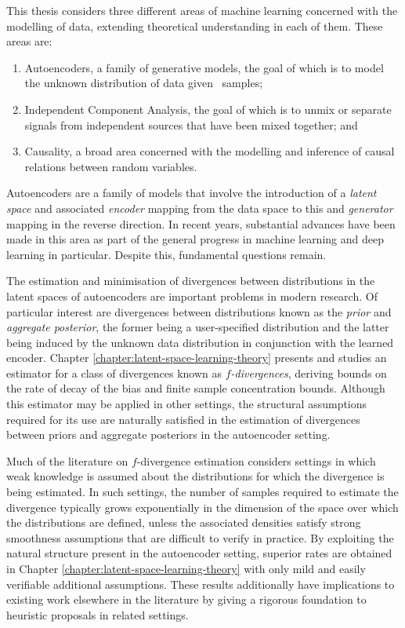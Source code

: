 This thesis considers three different areas of machine learning concerned with the modelling of data, extending theoretical understanding in each of them.
These areas are:
\begin{enumerate}
\item Autoencoders, a family of generative models, the goal of which is to model the unknown distribution of data given \iid~samples;
\item Independent Component Analysis, the goal of which is to unmix or separate signals from independent sources that have been mixed together; and
\item Causality, a broad area concerned with the modelling and inference of causal relations between random variables.
\end{enumerate}
Autoencoders are a family of models that involve the introduction of a \emph{latent space} and associated \emph{encoder} mapping from the data space to this and \emph{generator} mapping in the reverse direction. 
In recent years, substantial advances have been made in this area as part of the general progress in machine learning and deep learning in particular.
Despite this, fundamental questions remain.

The estimation and minimisation of divergences between distributions in the latent spaces of autoencoders are important problems in modern research.
Of particular interest are divergences between distributions known as the \emph{prior} and \emph{aggregate posterior}, the former being a user-specified distribution and the latter being induced by the unknown data distribution in conjunction with the learned encoder.
Chapter \ref{chapter:latent-space-learning-theory} presents and studies an estimator for a class of divergences known as \emph{$f$-divergences}, deriving bounds on the rate of decay of the bias and finite sample concentration bounds.
Although this estimator may be applied in other settings, the structural assumptions required for its use are naturally satisfied in the estimation of divergences between priors and aggregate posteriors in the autoencoder setting. 


Much of the literature on $f$-divergence estimation considers settings in which weak knowledge is assumed about the distributions for which the divergence is being estimated. 
In such settings, the number of samples required to estimate the divergence typically grows exponentially in the dimension of the space over which the distributions are defined, unless the associated densities satisfy strong smoothness assumptions that are difficult to verify in practice.
By exploiting the natural structure present in the autoencoder setting, superior rates are obtained in Chapter \ref{chapter:latent-space-learning-theory} with only mild and easily verifiable additional assumptions.
These results additionally have implications to existing work elsewhere in the literature by giving a rigorous foundation to heuristic proposals in related settings.


